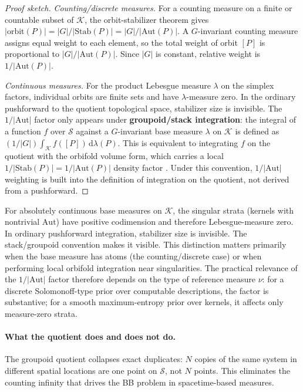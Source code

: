 \documentclass[12pt]{article}
\theoremstyle{remark}
\newcommand{\Aut}{\mathrm{Aut}}
\newcommand{\Stab}{\mathrm{Stab}}
\begin{document}
\begin{proof}[Proof sketch]
\emph{Counting/discrete measures.} For a counting measure on a finite or countable subset of $\mathcal{K}$, the orbit-stabilizer theorem gives $|\mathrm{orbit}(P)| = |G|/|\Stab(P)| = |G|/|\Aut(P)|$. A $G$-invariant counting measure assigns equal weight to each element, so the total weight of orbit $[P]$ is proportional to $|G|/|\Aut(P)|$. Since $|G|$ is constant, relative weight is $1/|\Aut(P)|$.

\emph{Continuous measures.} For the product Lebesgue measure $\lambda$ on the simplex factors, individual orbits are finite sets and have $\lambda$-measure zero. In the ordinary pushforward to the quotient topological space, stabilizer size is invisible. The $1/|\Aut|$ factor only appears under \textbf{groupoid/stack integration}: the integral of a function $f$ over $\mathcal{S}$ against a $G$-invariant base measure $\lambda$ on $\mathcal{K}$ is defined as $(1/|G|)\int_{\mathcal{K}} f([P])\,\mathrm{d}\lambda(P)$. This is equivalent to integrating $f$ on the quotient with the orbifold volume form, which carries a local $1/|\Stab(P)| = 1/|\Aut(P)|$ density factor \cite{weinstein2009}. Under this convention, $1/|\Aut|$ weighting is built into the definition of integration on the quotient, not derived from a pushforward.
\end{proof}

For absolutely continuous base measures on $\mathcal{K}$, the singular strata (kernels with nontrivial $\Aut$) have positive codimension and therefore Lebesgue-measure zero. In ordinary pushforward integration, stabilizer size is invisible. The stack/groupoid convention makes it visible. This distinction matters primarily when the base measure has atoms (the counting/discrete case) or when performing local orbifold integration near singularities. The practical relevance of the $1/|\Aut|$ factor therefore depends on the type of reference measure $\nu$: for a discrete Solomonoff-type prior over computable descriptions, the factor is substantive; for a smooth maximum-entropy prior over kernels, it affects only measure-zero strata.

\paragraph{What the quotient does and does not do.} The groupoid quotient collapses exact duplicates: $N$ copies of the same system in different spatial locations are one point on $\mathcal{S}$, not $N$ points. This eliminates the counting infinity that drives the BB problem in spacetime-based measures.
\end{document}
